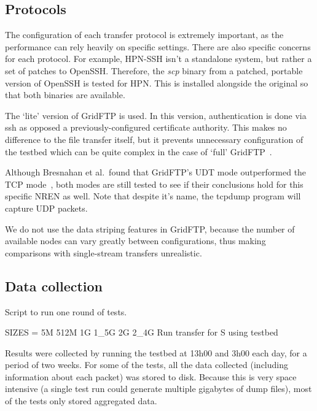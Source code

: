 \documentclass{sig-alternate-05-2015}
\begin{document}
\subsection{Protocols}
The configuration of each transfer protocol is extremely important, as the performance can rely heavily on specific settings. There are also specific concerns for each protocol. For example, HPN-SSH isn't a standalone system, but rather a set of patches to OpenSSH. Therefore, the \textit{scp} binary from a patched, portable version of OpenSSH is tested for HPN\@. This is installed alongside the original so that both binaries are available.

The `lite' version of GridFTP is used. In this version, authentication is done via ssh as opposed a previously-configured certificate authority. This makes no difference to the file transfer itself, but it prevents unnecessary configuration of the testbed which can be quite complex in the case of `full' GridFTP~\cite{gridftplite}.

Although Bresnahan et al.\ found that GridFTP's UDT mode outperformed the TCP mode~\cite{bresnahan2009udt}, both modes are still tested to see if their conclusions hold for this specific NREN as well. Note that despite it's name, the tcpdump program will capture UDP packets.

We do not use the data striping features in GridFTP, because the number of available nodes can vary greatly between configurations, thus making comparisons with single-stream transfers unrealistic.

\subsection{Data collection}
\begin{algorithm}[t]
\caption{Script to run one round of tests.}
	\begin{algorithmic}
		\STATE SIZES = 5M 512M 1G 1\_5G 2G 2\_4G
		\STATE Run transfer for S using testbed
		\ENDFOR
		\ENDFOR
	\end{algorithmic}
\label{alg:script}
\end{algorithm}

Results were collected by running the testbed at 13h00 and 3h00 each day, for a period of two weeks. For some of the tests, all the data collected (including information about each packet) was stored to disk. Because this is very space intensive (a single test run could generate multiple gigabytes of dump files), most of the tests only stored aggregated data. 
\end{document}
